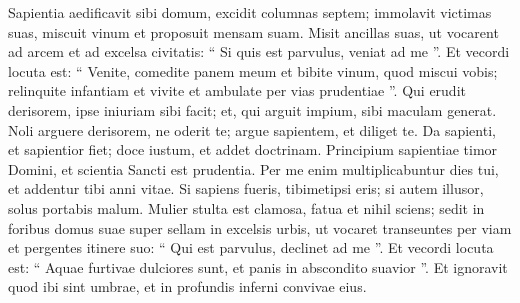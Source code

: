 \begin{biblechapter}
\begin{biblechapter}
\begin{biblechapter}
\begin{biblechapter}
\begin{biblechapter}
\begin{biblechapter}
\begin{biblechapter}
\begin{biblechapter}
\begin{biblechapter}
 \verse Sapientia aedificavit sibi domum,
 excidit columnas septem;
 \verse immolavit victimas suas, miscuit vinum
 et proposuit mensam suam.
 \verse Misit ancillas suas, ut vocarent
 ad arcem et ad excelsa civitatis:
 \verse “ Si quis est parvulus, veniat ad me ”.
 Et vecordi locuta est:
 \verse “ Venite, comedite panem meum
 et bibite vinum, quod miscui vobis; 
 \verse relinquite infantiam et vivite
 et ambulate per vias prudentiae ”.
 \verse Qui erudit derisorem, ipse iniuriam sibi facit;
 et, qui arguit impium, sibi maculam generat.
 \verse Noli arguere derisorem, ne oderit te;
 argue sapientem, et diliget te.
 \verse Da sapienti, et sapientior fiet;
 doce iustum, et addet doctrinam.
 \verse Principium sapientiae timor Domini,
 et scientia Sancti est prudentia.
 \verse Per me enim multiplicabuntur dies tui,
 et addentur tibi anni vitae.
 \verse Si sapiens fueris, tibimetipsi eris;
 si autem illusor, solus portabis malum.
 \verse Mulier stulta est clamosa,
 fatua et nihil sciens;
 \verse sedit in foribus domus suae
 super sellam in excelsis urbis,
 \verse ut vocaret transeuntes per viam
 et pergentes itinere suo:
 \verse “ Qui est parvulus, declinet ad me ”.
 Et vecordi locuta est:
 \verse “ Aquae furtivae dulciores sunt,
 et panis in abscondito suavior ”.
 \verse Et ignoravit quod ibi sint umbrae,
 et in profundis inferni convivae eius.
 

\end{biblechapter}
\end{biblechapter}
\end{biblechapter}
\end{biblechapter}
\end{biblechapter}
\end{biblechapter}
\end{biblechapter}
\end{biblechapter}
\end{biblechapter}
